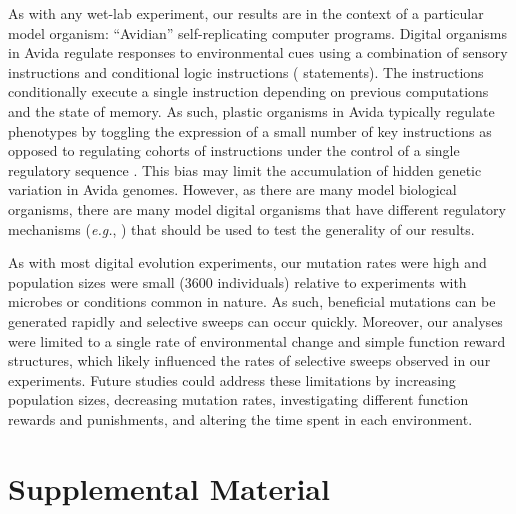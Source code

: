 \begin{raggedbottom}
As with any wet-lab experiment, our results are in the context of a particular model organism: ``Avidian'' self-replicating computer programs.
Digital organisms in Avida regulate responses to environmental cues using a combination of sensory instructions and conditional logic instructions ( statements).
The  instructions conditionally execute a single instruction depending on previous computations and the state of memory.
As such, plastic organisms in Avida typically regulate phenotypes by toggling the expression of a small number of key instructions as opposed to regulating cohorts of instructions under the control of a single regulatory sequence \citep{supplemental_material}.
This bias may limit the accumulation of hidden genetic variation in Avida genomes.
However, as there are many model biological organisms, there are many model digital organisms that have different regulatory mechanisms (\textit{e.g.}, \citealt{lalejini_evolving_2018}) that should be used to test the generality of our results.

As with most digital evolution experiments, our mutation rates were high and population sizes were small (3600 individuals) relative to experiments with microbes or conditions common in nature.
As such, beneficial mutations can be generated rapidly and selective sweeps can occur quickly.
Moreover, our analyses were limited to a single rate of environmental change and simple function reward structures, which likely influenced the rates of selective sweeps observed in our experiments. 
Future studies could address these limitations by increasing population sizes, decreasing mutation rates, investigating different function rewards and punishments, and altering the time spent in each environment. %


\end{raggedbottom}

\section*{Supplemental Material}

